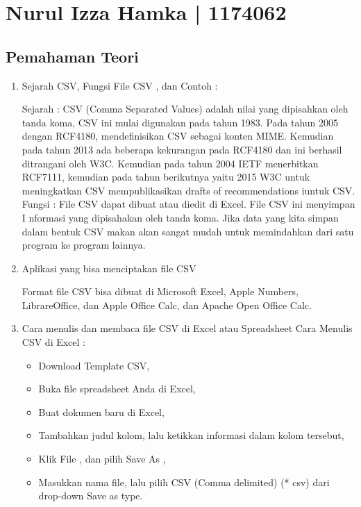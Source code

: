 

\section{Nurul Izza Hamka | 1174062}
\subsection{Pemahaman Teori}
\begin{enumerate}

\item Sejarah CSV, Fungsi File CSV , dan Contoh :

Sejarah : CSV (Comma Separated Values) adalah nilai yang dipisahkan oleh tanda koma, CSV ini mulai digunakan pada tahun 1983. 
Pada tahun 2005  dengan RCF4180, mendefinisikan CSV sebagai konten MIME. 
Kemudian pada tahun 2013 ada beberapa kekurangan pada RCF4180	dan ini berhasil ditrangani oleh W3C. 
Kemudian pada tahun 2004 IETF menerbitkan RCF7111, 
kemudian pada tahun berikutnya yaitu 2015 W3C untuk meningkatkan CSV mempublikasikan  drafts of recommendations iuntuk CSV.\\

Fungsi : File CSV dapat dibuat atau diedit di Excel. 
File CSV ini menyimpan I nformasi yang dipisahakan  oleh tanda koma. 
Jika data yang kita simpan dalam bentuk CSV makan akan sangat mudah untuk memindahkan dari satu program ke program lainnya.



\item Aplikasi yang bisa menciptakan file CSV 

Format file CSV bisa dibuat di Microsoft Excel, Apple Numbers, LibrareOffice, dan Apple Office Calc, dan Apache Open Office Calc.

\item Cara menulis dan membaca file CSV di Excel atau Spreadsheet
Cara Menulis CSV di Excel :\\
\begin{itemize}
\item Download Template CSV,\\
\item Buka file spreadsheet Anda di Excel,\\
\item Buat dokumen baru di Excel,\\
\item Tambahkan judul kolom, lalu ketikkan informasi dalam kolom tersebut,\\
\item Klik File , dan pilih Save As ,\\
\item Masukkan nama file, lalu pilih CSV (Comma delimited) (* csv) dari drop-down Save as type.\\
\end{itemize}


\end{enumerate}
